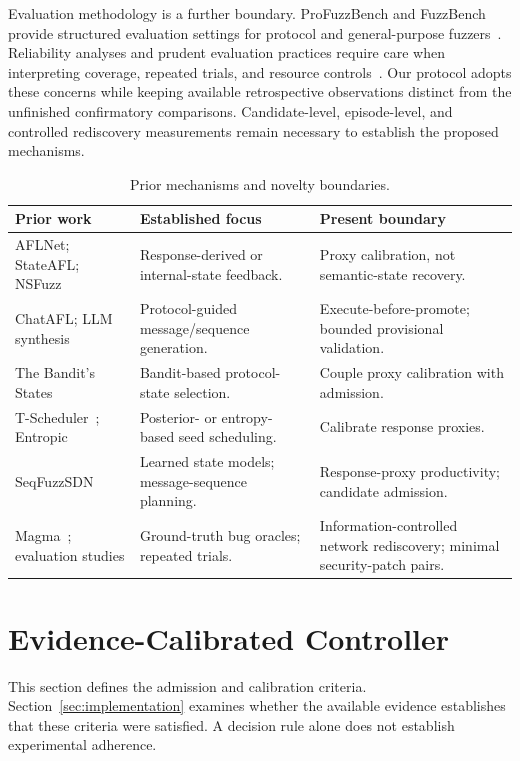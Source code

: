 \documentclass[final,5p,times,number]{elsarticle}
\begin{document}
Evaluation methodology is a further boundary. ProFuzzBench and FuzzBench provide structured evaluation settings for protocol and general-purpose fuzzers~\cite{profuzzbench_benchmark_stateful_protocol_2021,fuzzbench2021}. Reliability analyses and prudent evaluation practices require care when interpreting coverage, repeated trials, and resource controls~\cite{reliability_benchmarking_2022,sok_prudent_evaluation_practices_2024}. Our protocol adopts these concerns while keeping available retrospective observations distinct from the unfinished confirmatory comparisons. Candidate-level, episode-level, and controlled rediscovery measurements remain necessary to establish the proposed mechanisms.

\begin{table}[!tbp]
\centering\small
\caption{Prior mechanisms and novelty boundaries.}
\label{tab:novelty}
\begin{tabularx}{\textwidth}{l Y Y}
\toprule
Prior work & Established focus & Present boundary \\
\midrule
AFLNet; StateAFL; NSFuzz & Response-derived or internal-state feedback. & Proxy calibration, not semantic-state recovery. \\
ChatAFL; LLM synthesis & Protocol-guided message/sequence generation. & Execute-before-promote; bounded provisional validation. \\
The Bandit's States~\cite{bandits_states2023} & Bandit-based protocol-state selection. & Couple proxy calibration with admission. \\
T-Scheduler~\cite{tscheduler2024}; Entropic~\cite{entropic2020} & Posterior- or entropy-based seed scheduling. & Calibrate response proxies. \\
SeqFuzzSDN~\cite{seqfuzzsdn2026} & Learned state models; message-sequence planning. & Response-proxy productivity; candidate admission. \\
Magma~\cite{magma2020}; evaluation studies & Ground-truth bug oracles; repeated trials. & Information-controlled network rediscovery; minimal security-patch pairs. \\
\bottomrule
\end{tabularx}
\end{table}

\section{Evidence-Calibrated Controller}
\label{sec:design}
This section defines the admission and calibration criteria. Section~\ref{sec:implementation} examines whether the available evidence establishes that these criteria were satisfied. A decision rule alone does not establish experimental adherence.
\end{document}
